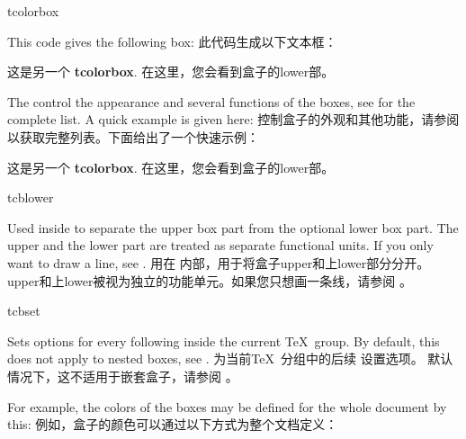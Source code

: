 \begin{docEnvironment}{tcolorbox}{}
\begin{stripedbox}
This code gives the following box:
\tcblower
此代码生成以下文本框：
\end{stripedbox}

\begin{tcolorbox}
这是另一个 \textbf{tcolorbox}.
\tcblower
在这里，您会看到盒子的lower部。
\end{tcolorbox}

\begin{stripedbox}
The  control the appearance and several functions of the boxes,
see  for the complete list.
A quick example is given here:
\tcblower
{}控制盒子的外观和其他功能，请参阅  以获取完整列表。下面给出了一个快速示例：
\end{stripedbox}

\begin{dispExample}
\begin{tcolorbox}[colback=red!5!white,colframe=red!75!black,title=My nice heading]
  这是另一个 \textbf{tcolorbox}.
\tcblower
在这里，您会看到盒子的lower部。
\end{tcolorbox}
\end{dispExample}
\end{docEnvironment}


\begin{docCommand}{tcblower}{}
\begin{stripedbox}
Used inside  to separate the upper box part from
the optional lower box part. The upper and the lower part are treated
as separate functional units. If you only want to draw a line, see
.
\tcblower
用在  内部，用于将盒子upper和上lower部分分开。upper和上lower被视为独立的功能单元。如果您只想画一条线，请参阅 。
\end{stripedbox}
\end{docCommand}


\begin{docCommand}{tcbset}{}
\begin{stripedbox}
Sets options for every following  inside the current \TeX\ group.
By default, this does not apply to nested boxes, see .
\tcblower
为当前\TeX\ 分组中的后续  设置选项。
默认情况下，这不适用于嵌套盒子，请参阅 。
\end{stripedbox}

\begin{stripedbox}
For example, the colors of the boxes may be defined for the whole document by this:
\tcblower
例如，盒子的颜色可以通过以下方式为整个文档定义：
\end{stripedbox}
  
\begin{dispListing}
\end{dispListing}
\end{docCommand}


